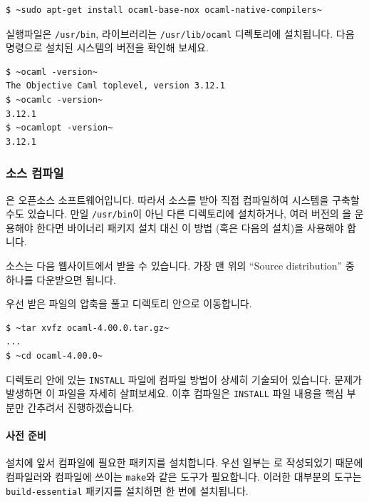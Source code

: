 \begin{lstlisting}
$ ~sudo apt-get install ocaml-base-nox ocaml-native-compilers~
\end{lstlisting}

\OCAML{} 실행파일은 \texttt{/usr/bin}, 라이브러리는 \texttt{/usr/lib/ocaml}
디렉토리에 설치됩니다. 다음 명령으로 설치된 시스템의 버전을
확인해 보세요.

\begin{lstlisting}
$ ~ocaml -version~
The Objective Caml toplevel, version 3.12.1
$ ~ocamlc -version~
3.12.1
$ ~ocamlopt -version~
3.12.1
\end{lstlisting}

\subsubsection{\OCAML{} 소스 컴파일}

\OCAML{}은 오픈소스 소프트웨어입니다. 따라서 소스를 받아 직접 컴파일하여
\OCAML{} 시스템을 구축할 수도 있습니다. 만일 \OCAML{}\을 \texttt{/usr/bin}이
아닌 다른 디렉토리에 설치하거나, 여러 버전의 \OCAML{}을 운용해야 한다면
바이너리 패키지 설치 대신 이 방법 (혹은 다음의 \GODI{} 설치)을 사용해야
합니다.

\OCAML{} 소스는 다음 웹사이트에서 받을 수 있습니다. 가장 맨 위의 ``Source
distribution'' 중 하나를 다운받으면 됩니다.

\begin{center}
\end{center}

우선 받은 파일의 압축을 풀고 디렉토리 안으로 이동합니다.

\begin{lstlisting}
$ ~tar xvfz ocaml-4.00.0.tar.gz~
...
$ ~cd ocaml-4.00.0~
\end{lstlisting}

디렉토리 안에 있는 \texttt{INSTALL} 파일에 컴파일 방법이 상세히 기술되어
있습니다. 문제가 발생하면 이 파일을 자세히 살펴보세요. 이후 컴파일은
\texttt{INSTALL} 파일 내용을 핵심 부분만 간추려서 진행하겠습니다.

\paragraph{사전 준비} 설치에 앞서 컴파일에 필요한 패키지를
설치합니다. 우선 \OCAML{} 일부는 \CC{}로 작성되었기 때문에 \CC{} 컴파일러와
컴파일에 쓰이는 \texttt{make}와 같은 도구가 필요합니다. 이러한 대부분의 도구는
\texttt{build-essential} 패키지를 설치하면 한 번에 설치됩니다.


